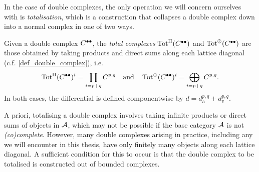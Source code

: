 In the case of double complexes, the only operation we will concern
ourselves with is \emph{totalisation}, which is a construction that
collapses a double complex down into a normal complex in one of two ways.

\begin{definition}
  \label{def_totalisation}
  Given a double complex ${{C}}^{\bullet \bullet}$, the \emph{total
  complexes} $\operatorname{Tot}^{\Pi}({{C}}^{\bullet \bullet})$ and
  $\operatorname{Tot}^{\oplus}({{C}}^{\bullet \bullet})$ are those obtained by taking
  products and direct sums along each lattice diagonal (c.f.
  \cref{def_double_complex}), i.e.
  \[
    \operatorname{Tot}^{\Pi}({{C}}^{\bullet \bullet})^i = \prod_{i = p + q} C^{p, q}
    \quad \text{and} \quad
    \operatorname{Tot}^{\oplus}({{C}}^{\bullet \bullet})^i = \bigoplus_{i = p + q} C^{p, q}.
  \]
  In both cases, the differential is defined componentwise by $d =
  d_h^{p, q} + d_v^{p, q}$.
\end{definition}

\begin{remark}
  A priori, totalising a double complex involves taking infinite
  products or direct sums of objects in $\mathcal{A}$, which may not be
  possible if the base category $\mathcal{A}$ is not \emph{(co)complete}.
  However, many double complexes arising in practice, including any
  we will encounter in this thesis, have only finitely many objects
  along each lattice diagonal.
  A sufficient condition for this to occur is that the double complex
  to be totalised is constructed out of bounded complexes.
\end{remark}
